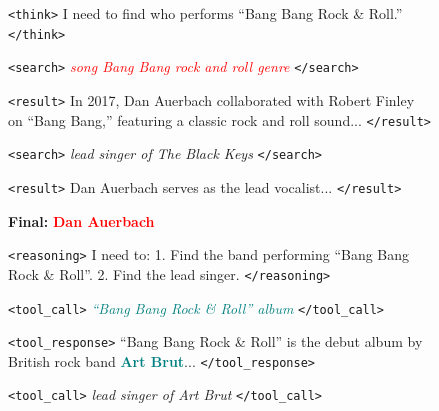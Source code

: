 \documentclass[11pt]{article}
\newcommand{\method}{\textsc{Search-P1}\xspace}
\begin{document}
\begin{figure}[t]
\centering
\begin{tcolorbox}[colback=gray!5, colframe=gray!60, title=\textbf{Query: Who is the lead singer of the band performing Bang Bang Rock \& Roll? \hfill Answer: Eddie Argos}, fonttitle=\bfseries, boxrule=0.8pt, left=2mm, right=2mm, top=2mm, bottom=2mm]

\begin{minipage}[t]{0.48\textwidth}
\begin{tcolorbox}[colback=red!3, colframe=red!40, title=\textbf{Search-R1 (Incorrect)}, fonttitle=\bfseries, boxrule=0.5pt, left=2mm, right=2mm, top=1mm, bottom=1mm]
\texttt{<think>} I need to find who performs ``Bang Bang Rock \& Roll.'' \texttt{</think>}

\colorbox{yellow!30}{\texttt{<search>}} \textcolor{red}{\textit{song Bang Bang rock and roll genre}} \colorbox{yellow!30}{\texttt{</search>}}

\texttt{<result>} In 2017, Dan Auerbach collaborated with Robert Finley on ``Bang Bang,'' featuring a classic rock and roll sound... \texttt{</result>}

\colorbox{yellow!30}{\texttt{<search>}} \textit{lead singer of The Black Keys} \colorbox{yellow!30}{\texttt{</search>}}

\texttt{<result>} Dan Auerbach serves as the lead vocalist... \texttt{</result>}

\textbf{Final:} \textcolor{red}{} \textcolor{red}{\textbf{Dan Auerbach}}
\end{tcolorbox}
\end{minipage}
\hfill
\begin{minipage}[t]{0.48\textwidth}
\begin{tcolorbox}[colback=green!3, colframe=green!40, title=\textbf{\method (Correct)}, fonttitle=\bfseries, boxrule=0.5pt, left=2mm, right=2mm, top=1mm, bottom=1mm]
\texttt{<reasoning>} I need to: 1. Find the band performing ``Bang Bang Rock \& Roll''. 2. Find the lead singer. \texttt{</reasoning>}

\colorbox{yellow!30}{\texttt{<tool\_call>}} \textcolor{teal}{\textit{``Bang Bang Rock \& Roll'' album}} \colorbox{yellow!30}{\texttt{</tool\_call>}}

\texttt{<tool\_response>} ``Bang Bang Rock \& Roll'' is the debut album by British rock band \textcolor{teal}{\textbf{Art Brut}}... \texttt{</tool\_response>}

\colorbox{yellow!30}{\texttt{<tool\_call>}} \textit{lead singer of Art Brut} \colorbox{yellow!30}{\texttt{</tool\_call>}}


\end{tcolorbox}
\end{minipage}
\end{tcolorbox}
\end{figure}
\end{document}
